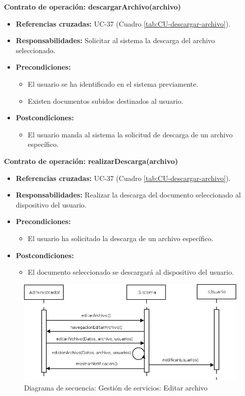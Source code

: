 \textbf{Contrato de operación: descargarArchivo(archivo)}
\begin{itemize}
\item \textbf{Referencias cruzadas:} UC-37 (Cuadro \ref{tab:CU-descargar-archivo}).
\item \textbf{Responsabilidades:} Solicitar al sistema la descarga del archivo seleccionado.
\item \textbf{Precondiciones:} 
 \begin{itemize}
\item El usuario se ha identificado en el sistema previamente.
\item Existen documentos subidos destinados al usuario.
\end {itemize}
\item \textbf{Postcondiciones:} 
 \begin{itemize}
\item El usuario manda al sistema la solicitud de descarga de un archivo específico.
\end {itemize}
\end {itemize}

\textbf{Contrato de operación: realizarDescarga(archivo)}
\begin{itemize}
\item \textbf{Referencias cruzadas:} UC-37 (Cuadro \ref{tab:CU-descargar-archivo}).
\item \textbf{Responsabilidades:} Realizar la descarga del documento seleccionado al dispositivo del usuario.
\item \textbf{Precondiciones:} 
 \begin{itemize}
\item El usuario ha solicitado la descarga de un archivo específico.
\end {itemize}
\item \textbf{Postcondiciones:} 
 \begin{itemize}
\item El documento seleccionado se descargará al dispositivo del usuario.
\end {itemize}
\end {itemize}


\vspace{10mm}

\begin{figure}[H]
\centering
  \includegraphics[scale=.50]{img/secuencias/gestion-servicios-editar-archivo.jpeg}
  \caption{Diagrama de secuencia: Gestión de servicios: Editar archivo}
  \label{fig:secuencia-gestion-servicios-editar-archivo}
\end{figure}

